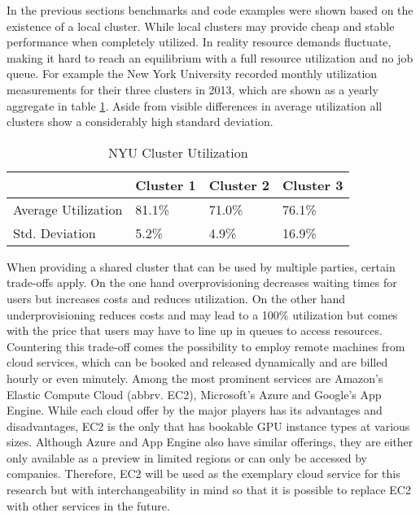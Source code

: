 In the previous sections benchmarks and code examples were shown based on the existence of a local cluster.
While local clusters may provide cheap and stable performance when completely utilized. In reality resource demands fluctuate, making it hard to reach an equilibrium with a full resource utilization and no job queue. For example the New York University recorded monthly utilization measurements for their three clusters in 2013\cite{nyu}, which are shown as a yearly aggregate in table \ref{table:cluster_utilization}. Aside from visible differences in average utilization all clusters show a considerably high standard deviation.

\begin{table}[!htb]
	\centering
	\begin{adjustbox}{width=0.5\textwidth}
		\small
		\begin{tabular}{l | l | l | l}
			~						& Cluster 1	& Cluster 2	& Cluster 3                 \\
			\hline
			Average Utilization 	& 81.1\%  	& 71.0\% 	& 76.1\% \\
			Std. Deviation          & 5.2\%  	& 4.9\%		& 16.9\% \\
		\end{tabular}
	\end{adjustbox}
	
	\caption{NYU Cluster Utilization}
	\label{table:cluster_utilization}
\end{table}

When providing a shared cluster that can be used by multiple parties, certain trade-offs apply. On the one hand overprovisioning decreases waiting times for users but increases costs and reduces utilization. On the other hand underprovisioning reduces costs and may lead to a 100\% utilization but comes with the price that users may have to line up in queues to access resources. Countering this trade-off comes the possibility to employ remote machines from cloud services, which can be booked and released dynamically and are billed hourly or even minutely. Among the most prominent services are Amazon's Elastic Compute Cloud (abbrv. EC2), Microsoft's Azure and Google's App Engine. While each cloud offer by the major players has its advantages and disadvantages, EC2 is the only that has bookable GPU instance types at various sizes. Although Azure and App Engine also have similar offerings, they are either only available as a preview in limited regions or can only be accessed by companies. Therefore, EC2 will be used as the exemplary cloud service for this research but with interchangeability in mind so that it is possible to replace EC2 with other services in the future.



